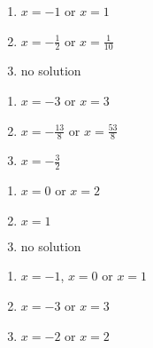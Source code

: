 \begin{multicols}{3}
\begin{enumerate}
\setcounter{enumi}{\value{HW}}

\item  $x = -1$ or $x= 1$

\item $x=-\frac{1}{2}$ or $x= \frac{1}{10}$

\item no solution

\setcounter{HW}{\value{enumi}}
\end{enumerate}
\end{multicols}

\begin{multicols}{3}
\begin{enumerate}
\setcounter{enumi}{\value{HW}}

\item  $x=-3$ or $x= 3$

\item $x = -\frac{13}{8}$ or $x= \frac{53}{8}$

\item $x=-\frac{3}{2}$

\setcounter{HW}{\value{enumi}}
\end{enumerate}
\end{multicols}


\begin{multicols}{3}
\begin{enumerate}
\setcounter{enumi}{\value{HW}}

\item  $x=0$ or $x= 2$

\item  $x=1$

\item  no solution

\setcounter{HW}{\value{enumi}}
\end{enumerate}
\end{multicols}


\begin{multicols}{3}
\begin{enumerate}
\setcounter{enumi}{\value{HW}}

\item  $x=-1$, $x= 0$ or $x= 1$

\item $x=-3$ or $x=3$

\item $x=-2$ or $x=2$

\setcounter{HW}{\value{enumi}}
\end{enumerate}
\end{multicols}

